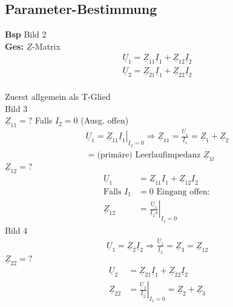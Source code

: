 \subsection{Parameter-Bestimmung}
\textbf{Bsp} Bild 2\\
\textbf{Ges:} $\underline{Z}$-Matrix\\
\begin{align}
	\underline{U}_1=\underline{Z}_{11}\underline{I}_1+\underline{Z}_{12}\underline{I}_2\nonumber\\
	\underline{U}_2=\underline{Z}_{21}\underline{I}_1+\underline{Z}_{22}\underline{I}_2\nonumber
	\end{align}\\
Zuerst allgemein als T-Glied\\
Bild 3\\
$\underline{Z}_{11}=?$
Falls $I_2=0$ (Ausg. offen)\\
\begin{align}
	\left. \underline{U}_1=\underline{Z}_{11}\underline{I}_1
	\right|_{\underline{I}_2=0}  \Rightarrow \underline{Z}_{11}=\frac{\underline{U}_1}{\underline{I}_1}=\underline{Z}_1+\underline{Z}_2\nonumber\\
	=\text{(primäre) Leerlaufimpedanz }\underline{Z}_{1l}\nonumber
\end{align}
$\underline{Z}_{12}=?$\\
\begin{align}
	\underline{U}_1&=\underline{Z}_{11}\underline{I}_1+\underline{Z}_{12}\underline{I}_2\nonumber\\
	\text{Falls } I_1&=0 \text{ Eingang offen}:\nonumber\\
	\underline{Z}_{12}&=\left.\frac{\underline{U}_1}{\underline{I}_2s}\right|_{\underline{I}_1=0}\nonumber
\end{align}
Bild 4\\
\begin{align}
	\underline{U}_1=\underline{Z}_2\underline{I}_2 \Rightarrow
	\frac{\underline{U}_1}{\underline{I}_2}=\underline{Z}_3=\underline{Z}_{12}\nonumber
\end{align}
$\underline{Z}_{22}=?$\\
\begin{align}
	\underline{U}_2&=\underline{Z}_{21}\underline{I}_1+\underline{Z}_{22}\underline{I}_2\nonumber\\
	\underline{Z}_{22}&=\left.\frac{\underline{U}_2}{\underline{I}_2}\right|_{I_1=0}=\underline{Z}_2+\underline{Z}_3\nonumber
\end{align}
